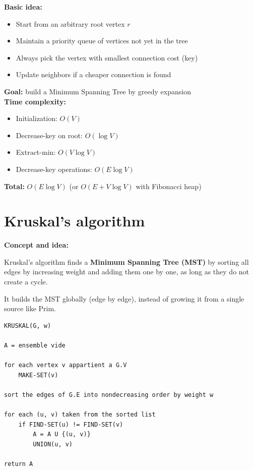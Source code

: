 \documentclass[11pt,a4paper,openany]{book}
\begin{document}
\textbf{Basic idea:}
\begin{itemize}
    \item Start from an arbitrary root vertex $r$
    \item Maintain a priority queue of vertices not yet in the tree
    \item Always pick the vertex with smallest connection cost (key)
    \item Update neighbors if a cheaper connection is found
\end{itemize}

\textbf{Goal:} build a Minimum Spanning Tree by greedy expansion \\

\textbf{Time complexity:}
\begin{itemize}
    \item Initialization: $O(V)$
    \item Decrease-key on root: $O(\log V)$
    \item Extract-min: $O(V \log V)$
    \item Decrease-key operations: $O(E \log V)$
\end{itemize}

\textbf{Total:} $O(E \log V)$ (or $O(E + V \log V)$ with Fibonacci heap)









\vspace{2cm}





\section{Kruskal's algorithm}


\textbf{Concept and idea:}

Kruskal’s algorithm finds a \textbf{Minimum Spanning Tree (MST)} by sorting all edges by increasing weight and adding them one by one, as long as they do not create a cycle.

It builds the MST globally (edge by edge), instead of growing it from a single source like Prim.

\begin{lstlisting}
KRUSKAL(G, w)

A = ensemble vide

for each vertex v appartient a G.V
    MAKE-SET(v)

sort the edges of G.E into nondecreasing order by weight w

for each (u, v) taken from the sorted list
    if FIND-SET(u) != FIND-SET(v)
        A = A U {(u, v)}
        UNION(u, v)

return A
\end{lstlisting}
\end{document}
